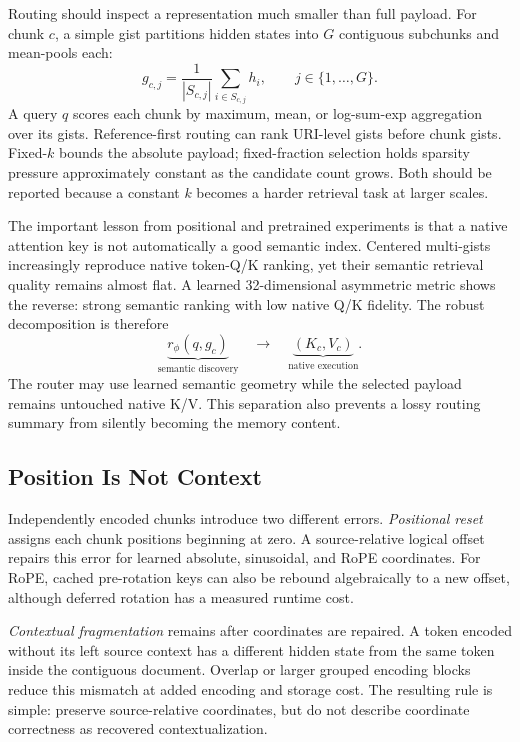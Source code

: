 Routing should inspect a representation much smaller than full payload. For chunk $c$, a
simple gist partitions hidden states into $G$ contiguous subchunks and mean-pools each:
\begin{equation}
g_{c,j}=\frac{1}{|S_{c,j}|}\sum_{i\in S_{c,j}}h_i,
\qquad j\in\{1,\ldots,G\}.
\end{equation}
A query $q$ scores each chunk by maximum, mean, or log-sum-exp aggregation over its gists.
Reference-first routing can rank URI-level gists before chunk gists. Fixed-$k$ bounds the
absolute payload; fixed-fraction selection holds sparsity pressure approximately constant
as the candidate count grows. Both should be reported because a constant $k$ becomes a
harder retrieval task at larger scales.

The important lesson from positional and pretrained experiments is that a native attention
key is not automatically a good semantic index. Centered multi-gists increasingly reproduce
native token-Q/K ranking, yet their semantic retrieval quality remains almost flat. A learned
32-dimensional asymmetric metric shows the reverse: strong semantic ranking with low native
Q/K fidelity. The robust decomposition is therefore
\begin{equation}
\underbrace{r_\phi(q,g_c)}_{\text{semantic discovery}}
\quad\longrightarrow\quad
\underbrace{(K_c,V_c)}_{\text{native execution}}.
\end{equation}
The router may use learned semantic geometry while the selected payload remains untouched
native K/V. This separation also prevents a lossy routing summary from silently becoming the
memory content.

\subsection{Position Is Not Context}

Independently encoded chunks introduce two different errors. \emph{Positional reset} assigns
each chunk positions beginning at zero. A source-relative logical offset repairs this error
for learned absolute, sinusoidal, and RoPE coordinates. For RoPE, cached pre-rotation keys can
also be rebound algebraically to a new offset, although deferred rotation has a measured
runtime cost.

\emph{Contextual fragmentation} remains after coordinates are repaired. A token encoded
without its left source context has a different hidden state from the same token inside the
contiguous document. Overlap or larger grouped encoding blocks reduce this mismatch at added
encoding and storage cost. The resulting rule is simple: preserve source-relative coordinates,
but do not describe coordinate correctness as recovered contextualization.

